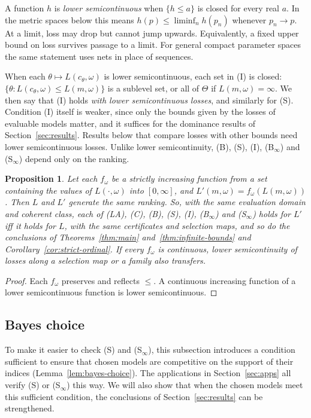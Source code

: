 \documentclass[11pt]{article}
\newtheorem{proposition}[theorem]{Proposition}
\theoremstyle{definition}
\theoremstyle{remark}
\begin{document}
A function $h$ is \emph{lower semicontinuous} when $\{h\le a\}$ is closed for every real $a$. In the metric spaces below this means $h(p)\le\liminf_n h(p_n)$ whenever $p_n\to p$. At a limit, loss may drop but cannot jump upwards. Equivalently, a fixed upper bound on loss survives passage to a limit. For general compact parameter spaces the same statement uses nets in place of sequences.

When each $\theta\mapsto L(c_\theta,\omega)$ is lower semicontinuous, each set in (I) is closed: $\{\theta:L(c_\theta,\omega)\le L(m,\omega)\}$ is a sublevel set, or all of $\Theta$ if $L(m,\omega)=\infty$. We then say that (I) holds \emph{with lower semicontinuous losses}, and similarly for (S). Condition (I) itself is weaker, since only the bounds given by the losses of evaluable models matter, and it suffices for the dominance results of Section~\ref{sec:results}. Results below that compare losses with other bounds need lower semicontinuous losses. Unlike lower semicontinuity, (B), (S), (I), (B$_\infty$) and (S$_\infty$) depend only on the ranking.
\begin{proposition}\label{prop:ordinal}
Let each $f_\omega$ be a strictly increasing function from a set containing the values of $L(\cdot,\omega)$ into $[0,\infty]$, and $L'(m,\omega)=f_\omega(L(m,\omega))$. Then $L$ and $L'$ generate the same ranking. So, with the same evaluation domain and coherent class, each of (LA), (C), (B), (S), (I), (B$_\infty$) and (S$_\infty$) holds for $L'$ iff it holds for $L$, with the same certificates and selection maps, and so do the conclusions of Theorems~\ref{thm:main} and~\ref{thm:infinite-bounds} and Corollary~\ref{cor:strict-ordinal}. If every $f_\omega$ is continuous, lower semicontinuity of losses along a selection map or a family also transfers.
\end{proposition}
\begin{proof}
Each $f_\omega$ preserves and reflects $\le$. A continuous increasing function of a lower semicontinuous function is lower semicontinuous.
\end{proof}

\subsection{Bayes choice}\label{sec:bayes}

To make it easier to check (S) and (S$_\infty$), this subsection introduces a condition sufficient to ensure that chosen models are competitive on the support of their indices (Lemma~\ref{lem:bayes-choice}). The applications in Section~\ref{sec:apps} all verify (S) or (S$_\infty$) this way. We will also show that when the chosen models meet this sufficient condition, the conclusions of Section~\ref{sec:results} can be strengthened.
\end{document}
